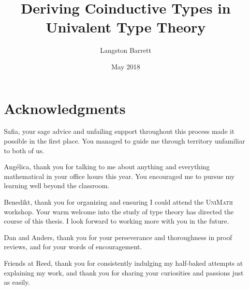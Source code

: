 \documentclass[12pt,twoside]{reedthesis}
\title{Deriving Coinductive Types in Univalent Type Theory}
\author{Langston Barrett}
\date{May 2018}
\let\oldindex\index
\renewcommand{\index}[1]
               {\oldindex{#1}\marginpar{\footnotesize\color{index}index: #1}}
\newcommand{\indeX}{\oldindex}
\newcommand{\indeX}{\index}
\newcommand{\software}[1]{{\textsc{#1}}\indeX{#1}}
\newcommand{\UniMath}{\software{UniMath}}
\begin{document}
\maketitle
\frontmatter %
\pagestyle{empty} %


\chapter*{Acknowledgments}

\noindent Safia, your sage advice and unfailing support throughout this
process made it possible in the first place. You managed to guide me through
territory unfamiliar to both of us.

\vspace{0.6em}

\noindent Angélica, thank you for talking to me about anything and everything
mathematical in your office hours this year. You encouraged me to pursue
my learning well beyond the classroom.

\vspace{0.6em}

\noindent Benedikt, thank you for organizing and ensuring I could attend
the \UniMath{} workshop. Your warm welcome into the study of type theory
has directed the course of this thesis. I look forward to working more with
you in the future.

\vspace{0.6em}

\noindent Dan and Anders, thank you for your perseverance and thoroughness in
proof reviews, and for your words of encouragement. 

\vspace{0.6em}

\noindent Friends at Reed, thank you for consistently indulging my half-baked
attempts at explaining my work, and thank you for sharing your curiosities and
passions just as easily.


\end{document}
